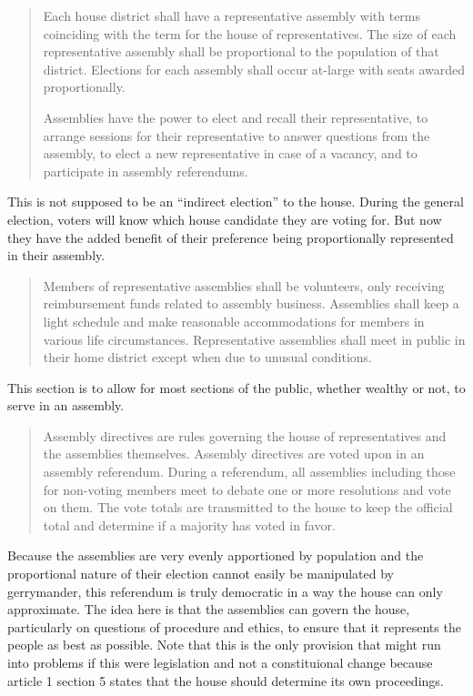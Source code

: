 \documentclass{article}
\begin{document}
\begin{quote}
Each house district shall have a representative assembly with terms coinciding with the term for the house of representatives. The size of each representative assembly shall be proportional to the population of that district. Elections for each assembly shall occur at-large with seats awarded proportionally.

Assemblies have the power to elect and recall their representative, to arrange sessions for their representative to answer questions from the assembly, to elect a new representative in case of a vacancy, and to participate in assembly referendums.
\end{quote}

This is not supposed to be an “indirect election” to the house. During the general election, voters will know which house candidate they are voting for. But now they have the added benefit of their preference being proportionally represented in their assembly.

\begin{quote}
Members of representative assemblies shall be volunteers, only receiving reimbursement funds related to assembly business. Assemblies shall keep a light schedule and make reasonable accommodations for members in various life circumstances. Representative assemblies shall meet in public in their home district except when due to unusual conditions.
\end{quote}

This section is to allow for most sections of the public, whether wealthy or not, to serve in an assembly.

\begin{quote}
Assembly directives are rules governing the house of representatives and the assemblies themselves. Assembly directives are voted upon in an assembly referendum. During a referendum, all assemblies including those for non-voting members meet to debate one or more resolutions and vote on them. The vote totals are transmitted to the house to keep the official total and determine if a majority has voted in favor.
\end{quote}

Because the assemblies are very evenly apportioned by population and the proportional nature of their election cannot easily be manipulated by gerrymander, this referendum is truly democratic in a way the house can only approximate. The idea here is that the assemblies can govern the house, particularly on questions of procedure and ethics, to ensure that it represents the people as best as possible. Note that this is the only provision that might run into problems if this were legislation and not a constituional change because article 1 section 5 states that the house should determine its own proceedings.
\end{document}
